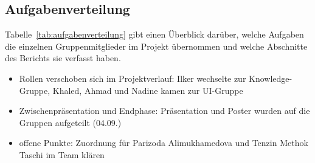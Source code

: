 
\subsection{Aufgabenverteilung}

Tabelle~\ref{tab:aufgabenverteilung} gibt einen Überblick darüber, welche
Aufgaben die einzelnen Gruppenmitglieder im Projekt übernommen und welche
Abschnitte des Berichts sie verfasst haben.


\begin{itemize}
    \item Rollen verschoben sich im Projektverlauf: Ilker wechselte zur Knowledge-Gruppe, Khaled, Ahmad und Nadine kamen zur UI-Gruppe
    \item Zwischenpräsentation und Endphase: Präsentation und Poster wurden auf die Gruppen aufgeteilt (04.09.)
    \item offene Punkte: Zuordnung für Parizoda Alimukhamedova und Tenzin Methok Taschi im Team klären
\end{itemize}

